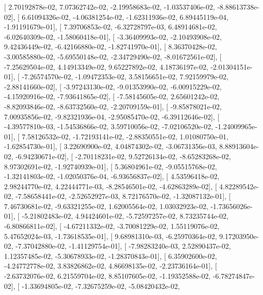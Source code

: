 \documentclass{article}
\begin{document}
       [  2.70192878e-02,   7.07362742e-02,  -2.19958683e-02,
         -1.03537406e-02,  -8.88613738e-02],
       [  6.61094326e-02,  -4.06381254e-02,  -1.62311936e-02,
          6.89445119e-04,  -1.91191679e-01],
       [  7.39706853e-02,  -6.32728797e-03,   6.48914681e-02,
         -6.02640309e-02,  -1.58060418e-01],
       [ -3.36409993e-02,  -2.10493908e-02,   9.42436449e-02,
         -6.42166880e-02,  -1.82741970e-01],
       [  8.36370428e-02,  -3.00585880e-02,  -5.69550148e-02,
         -2.34729490e-02,  -8.01672561e-02],
       [ -7.25629504e-02,   4.14913349e-02,   9.65227892e-02,
          4.18736197e-02,  -2.01304151e-01],
       [ -7.26574570e-02,  -1.09472353e-02,   3.58156651e-02,
          7.92159979e-02,  -2.88141660e-02],
       [ -3.97243130e-02,  -9.01353990e-02,  -6.00915229e-02,
         -4.15920916e-02,  -7.93641865e-02],
       [ -7.58145605e-02,   2.65601242e-02,  -8.82093846e-02,
         -8.63732560e-02,  -2.20709159e-01],
       [ -9.85878021e-02,   7.00935856e-02,  -9.82321936e-04,
         -2.95085470e-02,  -6.39112646e-02],
       [ -4.39577810e-03,  -1.54536866e-02,   3.59710056e-02,
         -7.02106520e-02,  -1.24009965e-01],
       [  7.58126532e-02,  -1.72193141e-02,  -2.88350551e-02,
          1.01080750e-01,  -1.62854730e-01],
       [  3.22690900e-02,   4.04874302e-02,  -3.06731356e-03,
          8.88913604e-02,  -6.94230671e-02],
       [ -2.70118231e-02,   9.52726134e-02,  -8.65283268e-02,
          8.97302691e-02,  -1.92740939e-01],
       [  5.36804961e-02,  -9.05515768e-02,  -1.32141803e-02,
         -1.02050376e-04,  -6.93656837e-02],
       [  4.53596418e-02,   2.98244770e-02,   4.22444771e-03,
         -8.28546501e-02,  -4.62863289e-02],
       [  4.82289542e-02,  -7.58658441e-02,  -2.52652927e-03,
          8.72176570e-02,  -1.32087132e-01],
       [  7.46730681e-02,  -9.63321255e-02,   1.62005564e-02,
          1.03032923e-02,  -1.73656026e-01],
       [ -5.21802483e-02,   4.94424601e-02,  -5.72597257e-02,
          8.73235744e-02,  -6.80866811e-02],
       [ -4.67211332e-02,  -3.70081229e-02,   1.55119076e-02,
          5.47652024e-03,  -1.73618535e-01],
       [  9.68981310e-03,  -6.25970364e-02,   9.17203950e-02,
         -7.37042880e-02,  -1.41129754e-01],
       [ -7.98283240e-03,   2.52890437e-02,   1.12357485e-02,
         -5.30678933e-02,  -1.28370843e-01],
       [  6.35902600e-02,  -4.24772778e-02,   3.83826862e-02,
          4.86698135e-02,  -2.23736164e-01],
       [ -2.63732076e-02,   6.21559704e-02,   8.85107605e-02,
         -1.19352588e-02,  -6.78274847e-02],
       [ -1.33694805e-02,  -7.32675259e-02,  -5.08420432e-02,
\end{document}
